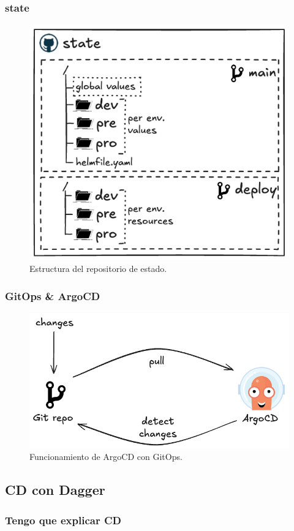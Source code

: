 \documentclass{beamer}
\begin{document}
\begin{frame}
    \frametitle{state}
    \begin{figure}
        \includegraphics[scale=0.3]{figuras/state}
        \caption{Estructura del repositorio de estado.}
    \end{figure}
\end{frame}

\begin{frame}
    \frametitle{GitOps \& ArgoCD}
    \begin{figure}
        \includegraphics[scale=0.35]{figuras/argocd-simple}
        \caption{Funcionamiento de ArgoCD con GitOps.}
    \end{figure}
\end{frame}

\subsection{CD con Dagger}
\begin{frame}
    \frametitle{Tengo que explicar CD}
\end{frame}
\end{document}
